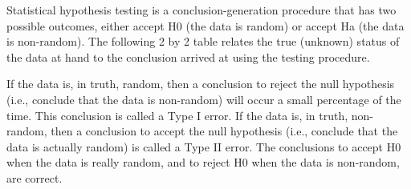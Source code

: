 Statistical hypothesis testing is a conclusion-generation procedure that has two possible outcomes, either accept H0 (the data is random) or accept Ha (the data is non-random). The following 2 by 2 table relates the true (unknown) status of the data at hand to the conclusion arrived at using the testing procedure. 



If the data is, in truth, random, then a conclusion to reject the null hypothesis (i.e., conclude that the data is non-random) will occur a small percentage of the time. This conclusion is called a Type I error. If the data is, in truth, non-random, then a conclusion to accept the null hypothesis (i.e., conclude that the data is actually random) is called a Type II error. The conclusions to accept H0 when the data is really random, and to reject H0 when the data is non-random, are correct. 

